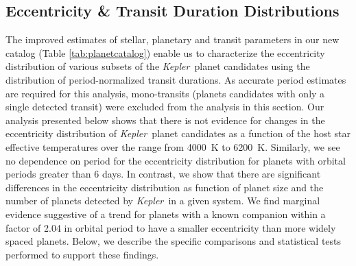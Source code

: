 \documentclass{aastex62}
\newcommand{\ik}{{\it Kepler~}}
\begin{document}






\subsection{Eccentricity \& Transit Duration Distributions}\label{sec:ecc}

{The improved estimates of stellar, planetary and transit parameters in our new catalog (Table \ref{tab:planetcatalog}) enable us to} characterize the eccentricity distribution of various subsets of the \ik planet candidates using the distribution of period-normalized transit durations.
{As accurate period estimates are required for this analysis, mono-transits (planets candidates with only a single detected transit) were excluded from the analysis in this section.  Our analysis presented below shows that there is not evidence for changes in the eccentricity distribution of \ik planet candidates as a function of the host star effective temperatures over the range from 4000~K to 6200~K.  Similarly, we see no dependence on period for the eccentricity distribution for planets with orbital periods greater than 6 days.  In contrast, we show that there are significant differences in the eccentricity distribution as function of planet size and the number of planets detected by \ik in a given system.  We find marginal evidence suggestive of a trend for planets with a known companion within a factor of 2.04 in orbital period to have a smaller eccentricity than more widely spaced planets.  Below, we describe the specific comparisons and statistical tests performed to support these findings.}
\end{document}
